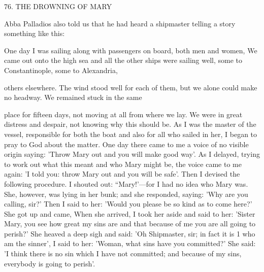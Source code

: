 76.
THE DROWNING OF MARY

Abba Palladios also told us that he had heard a shipmaster telling
a story something like this:

One day I was sailing along with passengers on board, both men
and women, We came out onto the high sea and all the other ships
were sailing well, some to Constantinople, some to Alexandria,

others elsewhere.
The wind stood well for each of them, but we
alone could make no headway.
We remained stuck in the same

place for fifteen days, not moving at all from where we lay.
We
were in great distress and despair, not knowing why this should be.
As I was the master of the vessel, responsible for both the boat and
also for all who sailed in her, I began to pray to God about the
matter.
One day there came to me a voice of no visible origin
saying: 'Throw Mary out and you will make good way'.
As I
delayed, trying to work out what this meant and who Mary might
be, the voice came to me again: 'I told you: throw Mary out and
you will be safe'.
Then I devised the following procedure.
I shouted
out: “Mary!'—for I had no idea who Mary was.
She, however, was
lying in her bunk; and she responded, saying: 'Why are you calling,
sir?' Then I said to her: 'Would you please be so kind as to come
here?' She got up and came, When she arrived, I took her aside and
said to her: 'Sister Mary, you see how great my sins are and that
because of me you are all going to perish?' She heaved a deep sigh
and said: 'Oh Shipmaster, sir; in fact it is 1 who am the sinner', I
said to her: 'Woman, what sins have you committed?' She said: 'I
think there is no sin which I have not committed; and because of
my sins, everybody is going to perish'.
